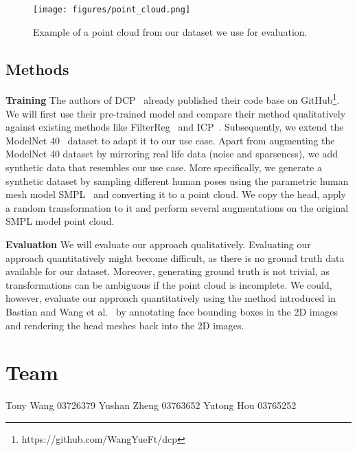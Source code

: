 \documentclass[a4paper,pagesize 10pt]{scrartcl}
\begin{document}
\begin{figure}[!ht]
    \centering
    \texttt{[image: figures/point\_cloud.png]}
    \caption{Example of a point cloud from our dataset we use for evaluation.}
    \label{fig:example_pcd}
\end{figure}

\subsection{Methods}

\textbf{Training} The authors of DCP~\cite{dcp} already published their code base on GitHub\footnote{https://github.com/WangYueFt/dcp}.
We will first use their pre-trained model and compare their method qualitatively against existing methods like FilterReg~\cite{filterreg} and ICP~\cite{icp}.
Subsequently, we extend the ModelNet 40~\cite{modelnet40} dataset to adapt it to our use case.
Apart from augmenting the ModelNet 40 dataset by mirroring real life data (noise and sparseness), we add synthetic data that resembles our use case.
More specifically, we generate a synthetic dataset by sampling different human poses using the parametric human mesh model SMPL~\cite{SMPL:2015} and converting it to a point cloud. 
We copy the head, apply a random transformation to it and perform several augmentations on the original SMPL model point cloud.

\noindent\textbf{Evaluation}
We will evaluate our approach qualitatively.
Evaluating our approach quantitatively might become difficult, as there is no ground truth data available for our dataset.
Moreover, generating ground truth is not trivial, as transformations can be ambiguous if the point cloud is incomplete.
We could, however, evaluate our approach quantitatively using the method introduced in Bastian and Wang et al.~\cite{disguisor} by annotating face bounding boxes in the 2D images and rendering the head meshes back into the 2D images.


\section{Team}
Tony Wang 03726379
\newline
Yushan Zheng 03763652
\newline
Yutong Hou 03765252

{\small
	
	
}
\end{document}
